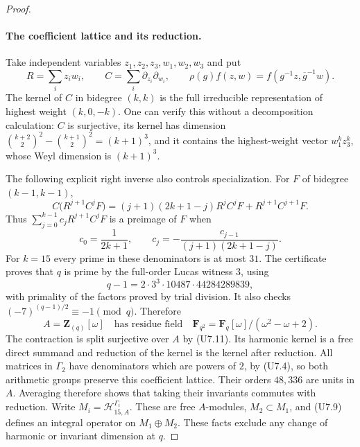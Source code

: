 \documentclass[11pt,a4paper]{article}
\theoremstyle{definition}
\begin{document}
\begin{proof}
\paragraph{The coefficient lattice and its reduction.}
Take independent variables $z_1,z_2,z_3,w_1,w_2,w_3$ and put
\[
 R=\sum_i z_iw_i,\qquad
 C=\sum_i\partial_{z_i}\partial_{w_i},\qquad
 \rho(g)f(z,w)=f(g^{-1}z,\overline g^{-1}w).
 \tag{U7.10}
\]
The kernel of $C$ in bidegree $(k,k)$ is the full irreducible
representation of highest weight $(k,0,-k)$. One can verify this
without a decomposition calculation: $C$ is surjective, its kernel
has dimension
$\binom{k+2}{2}^2-\binom{k+1}{2}^2=(k+1)^3$, and it contains
the highest-weight vector $w_1^kz_3^k$, whose Weyl dimension is
$(k+1)^3$.

The following explicit right inverse also controls specialization.
For $F$ of bidegree $(k-1,k-1)$,
\[
 C\bigl(R^{j+1}C^jF\bigr)
 =(j+1)(2k+1-j)R^jC^jF+R^{j+1}C^{j+1}F.
\]
Thus $\sum_{j=0}^{k-1}c_jR^{j+1}C^jF$ is a preimage of $F$ when
\[
 c_0=\frac1{2k+1},\qquad
 c_j=-\frac{c_{j-1}}{(j+1)(2k+1-j)}.
 \tag{U7.11}
\]
For $k=15$ every prime in these denominators is at most $31$.
The certificate proves that $q$ is prime by the full-order Lucas
witness $3$, using
\[
 q-1=2\cdot3^3\cdot10487\cdot44284289839,
 \tag{U7.12}
\]
with primality of the factors proved by trial division. It also
checks $(-7)^{(q-1)/2}\equiv-1\pmod q$. Therefore
\[
 A=\mathbf Z_{(q)}[\omega]
 \quad\text{has residue field}\quad
 \mathbf F_{q^2}=\mathbf F_q[\omega]/(\omega^2-\omega+2).
 \tag{U7.13}
\]
The contraction is split surjective over $A$ by (U7.11). Its
harmonic kernel is a free direct summand and reduction of the
kernel is the kernel after reduction. All matrices in $\Gamma_2$
have denominators which are powers of $2$, by (U7.4), so both
arithmetic groups preserve this coefficient lattice. Their orders
$48,336$ are units in $A$. Averaging therefore shows that taking
their invariants commutes with reduction. Write
$M_i=\mathcal H_{15,A}^{\Gamma_i}$. These are free $A$-modules,
$M_2\subset M_1$, and (U7.9) defines an integral operator on
$M_1\oplus M_2$. These facts exclude any change of harmonic or
invariant dimension at $q$.


\end{proof}
\end{document}

